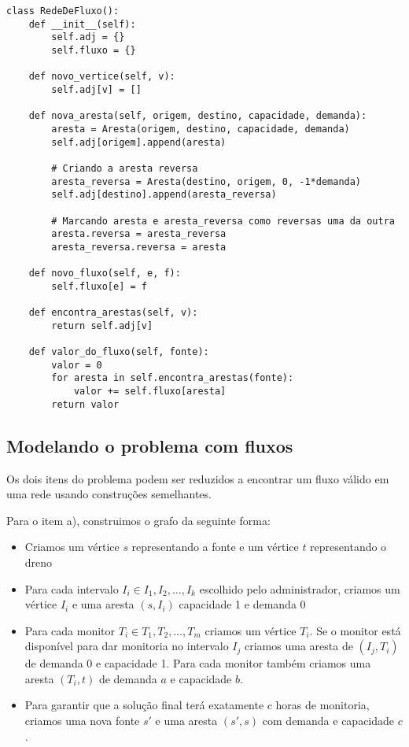 \documentclass[11pt]{article}
\begin{document}
\begin{verbatim}
class RedeDeFluxo():
    def __init__(self):
        self.adj = {}
        self.fluxo = {}

    def novo_vertice(self, v):
        self.adj[v] = []

    def nova_aresta(self, origem, destino, capacidade, demanda):
        aresta = Aresta(origem, destino, capacidade, demanda)
        self.adj[origem].append(aresta)

        # Criando a aresta reversa
        aresta_reversa = Aresta(destino, origem, 0, -1*demanda)
        self.adj[destino].append(aresta_reversa)

        # Marcando aresta e aresta_reversa como reversas uma da outra
        aresta.reversa = aresta_reversa
        aresta_reversa.reversa = aresta

    def novo_fluxo(self, e, f):
        self.fluxo[e] = f

    def encontra_arestas(self, v):
        return self.adj[v]

    def valor_do_fluxo(self, fonte):
        valor = 0
        for aresta in self.encontra_arestas(fonte):
            valor += self.fluxo[aresta]
        return valor
\end{verbatim}

\subsection{Modelando o problema com fluxos}
\label{sec-3-2}

Os dois itens do problema podem ser reduzidos a encontrar um fluxo
válido em uma rede usando construções semelhantes.

Para o item a), construimos o grafo da seguinte forma:

\begin{itemize}
\item Criamos um vértice $s$ representando a fonte e um vértice $t$
  representando o dreno
\item Para cada intervalo $I_i \in I_1, I_2, \ldots, I_k$ escolhido pelo
administrador, criamos um vértice $I_i$ e uma aresta $(s, I_i)$
capacidade 1 e demanda 0
\item Para cada monitor $T_i \in T_1, T_2, \ldots, T_m$ criamos um vértice
$T_i$. Se o monitor está disponível para dar monitoria no intervalo
$I_j$ criamos uma aresta de $(I_j, T_i)$ de demanda 0 e
capacidade 1. Para cada monitor também criamos uma aresta
$(T_i, t)$ de demanda $a$ e capacidade $b$.
\item Para garantir que a solução final terá exatamente $c$ horas de
monitoria, criamos uma nova fonte $s'$ e uma aresta $(s', s)$
com demanda e capacidade $c$.
\end{itemize}
\end{document}
